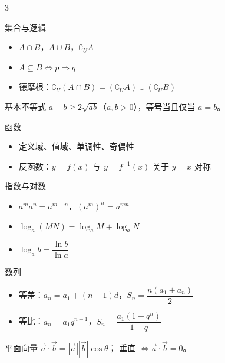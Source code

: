 \begin{multicols}{3}

\begin{fastcard}{集合与逻辑}
\begin{itemize}[leftmargin=1.2em, topsep=0.2ex, itemsep=0.1ex, parsep=0pt]
\item $A\cap B$，$A\cup B$，$\complement_U A$
\item $A\subseteq B \iff p\Rightarrow q$
\item 德摩根：$\complement_U(A\cap B)=(\complement_U A)\cup(\complement_U B)$
\end{itemize}
\end{fastcard}

\begin{fastcard}{基本不等式}
$a+b\ge 2\sqrt{ab}$（$a,b>0$），等号当且仅当 $a=b$。
\end{fastcard}

\begin{fastcard}{函数}
\begin{itemize}[leftmargin=1.2em, topsep=0.2ex, itemsep=0.1ex, parsep=0pt]
\item 定义域、值域、单调性、奇偶性
\item 反函数：$y=f(x)$ 与 $y=f^{-1}(x)$ 关于 $y=x$ 对称
\end{itemize}
\end{fastcard}

\begin{fastcard}{指数与对数}
\begin{itemize}[leftmargin=1.2em, topsep=0.2ex, itemsep=0.1ex, parsep=0pt]
\item $a^m a^n=a^{m+n}$，$(a^m)^n=a^{mn}$
\item $\log_a(MN)=\log_a M+\log_a N$
\item $\log_a b=\dfrac{\ln b}{\ln a}$
\end{itemize}
\end{fastcard}

\begin{fastcard}{数列}
\begin{itemize}[leftmargin=1.2em, topsep=0.2ex, itemsep=0.1ex, parsep=0pt]
\item 等差：$a_n=a_1+(n-1)d$，$S_n=\dfrac{n(a_1+a_n)}{2}$
\item 等比：$a_n=a_1q^{n-1}$，$S_n=\dfrac{a_1(1-q^n)}{1-q}$
\end{itemize}
\end{fastcard}

\begin{fastcard}{平面向量}
$\vec a\cdot\vec b=|\vec a||\vec b|\cos\theta$；
垂直 $\iff \vec a\cdot\vec b=0$。
\end{fastcard}


\end{multicols}
